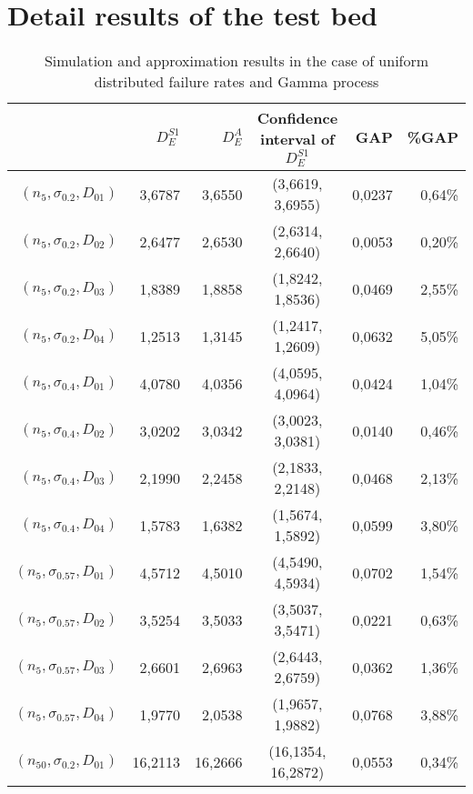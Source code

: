 \documentclass[preprint,12pt]{elsarticle}
\begin{document}
\section{Detail results of the test bed}
\begin{table}[htbp]
  \centering
  \caption{Simulation and approximation results in the case of uniform distributed failure rates and Gamma process}
    \begin{tabular}{rrrcrr}
    \toprule
          & $D_{E}^{S1}$ & $D_{E}^{A}$ & Confidence interval of $D_{E}^{S1}$ & GAP & \%GAP \\
    \midrule
$(n_{5},\sigma_{0.2},D_{01})$ & 3,6787 & 3,6550 & (3,6619, 3,6955) & 0,0237 & 0,64\% \\
$(n_{5},\sigma_{0.2},D_{02})$ & 2,6477 & 2,6530 & (2,6314, 2,6640) & 0,0053 & 0,20\% \\
$(n_{5},\sigma_{0.2},D_{03})$ & 1,8389 & 1,8858 & (1,8242, 1,8536) & 0,0469 & 2,55\% \\
$(n_{5},\sigma_{0.2},D_{04})$& 1,2513 & 1,3145 & (1,2417, 1,2609) & 0,0632 & 5,05\% \\
$(n_{5},\sigma_{0.4},D_{01})$ & 4,0780 & 4,0356 & (4,0595, 4,0964) & 0,0424 & 1,04\% \\
$(n_{5},\sigma_{0.4},D_{02})$ & 3,0202 & 3,0342 & (3,0023, 3,0381) & 0,0140 & 0,46\% \\
$(n_{5},\sigma_{0.4},D_{03})$ & 2,1990 & 2,2458 & (2,1833, 2,2148) & 0,0468 & 2,13\% \\
$(n_{5},\sigma_{0.4},D_{04})$ & 1,5783 & 1,6382 & (1,5674, 1,5892) & 0,0599 & 3,80\% \\
$(n_{5},\sigma_{0.57},D_{01})$ & 4,5712 & 4,5010 & (4,5490, 4,5934) & 0,0702 & 1,54\% \\
$(n_{5},\sigma_{0.57},D_{02})$   & 3,5254 & 3,5033 & (3,5037, 3,5471) & 0,0221 & 0,63\% \\
$(n_{5},\sigma_{0.57},D_{03})$  & 2,6601 & 2,6963 & (2,6443, 2,6759) & 0,0362 & 1,36\% \\
$(n_{5},\sigma_{0.57},D_{04})$  & 1,9770 & 2,0538 & (1,9657, 1,9882) & 0,0768 & 3,88\% \\
$(n_{50},\sigma_{0.2},D_{01})$ & 16,2113 & 16,2666 & (16,1354, 16,2872) & 0,0553 & 0,34\% \\

\end{tabular}
\end{table}
\end{document}
